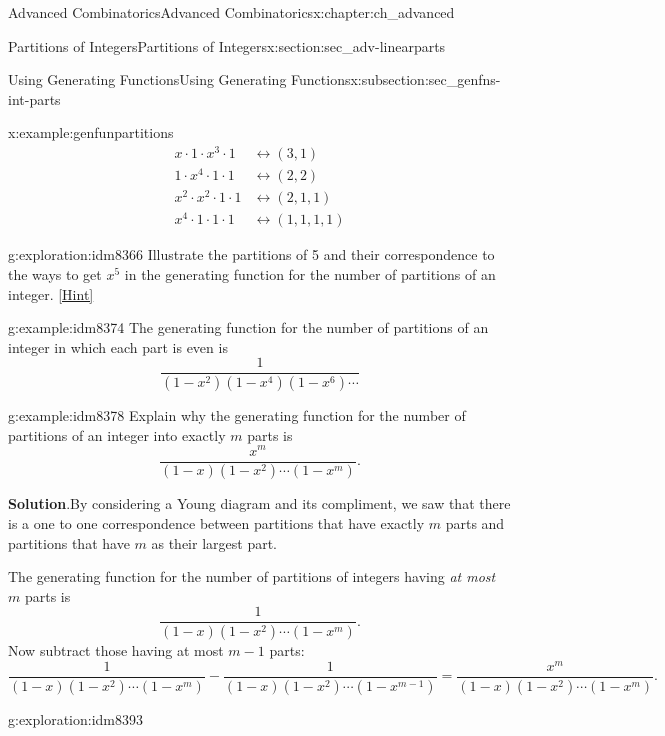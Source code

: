\documentclass[oneside,10pt,]{book}
\numberwithin{equation}{chapter}
\newcommand{\amp}{&}
\begin{document}
\begin{chapterptx}{Advanced Combinatorics}{}{Advanced Combinatorics}{}{}{x:chapter:ch_advanced}
\begin{sectionptx}{Partitions of Integers}{}{Partitions of Integers}{}{}{x:section:sec_adv-linearparts}
\begin{subsectionptx}{Using Generating Functions}{}{Using Generating Functions}{}{}{x:subsection:sec_genfns-int-parts}
\begin{example}{}{x:example:genfunpartitions}
\begin{align*}
x\cdot 1 \cdot x^3\cdot 1 \amp \leftrightarrow  (3,1) \\
1 \cdot x^4 \cdot 1\cdot 1 \amp \leftrightarrow  (2,2) \\
x^2\cdot x^2\cdot 1 \cdot 1 \amp \leftrightarrow  (2,1,1) \\
x^4 \cdot 1\cdot 1 \cdot 1 \amp \leftrightarrow  (1,1,1,1) 
\end{align*}
%
\end{example}
\begin{exploration}{}{g:exploration:idm8366}%
Illustrate the partitions of 5 and their correspondence to the ways to get \(x^5\) in the generating function for the number of partitions of an integer.%
\space\hspace*{0pt}\hfill{\tiny\hyperlink{g:hint:idm8370-back}{[Hint]}}\end{exploration}
\begin{example}{}{g:example:idm8374}%
The generating function for the number of partitions of an integer in which each part is even is%
\begin{equation*}
\frac{1}{(1-x^2)(1-x^4)(1-x^6)\cdots}
\end{equation*}
%
\end{example}
\begin{example}{}{g:example:idm8378}%
Explain why the generating function for the number of partitions of an integer into exactly \(m\) parts is%
\begin{equation*}
\frac{x^m}{(1-x)(1-x^2)\cdots(1-x^m)}\text{.}
\end{equation*}
%
\par\smallskip%
\noindent\textbf{Solution}.\hypertarget{g:solution:idm8383}{}\quad{}By considering a Young diagram and its compliment, we saw that there is a one to one correspondence between partitions that have exactly \(m\) parts and partitions that have \(m\) as their largest part.%
\par
The generating function for the number of partitions of integers having \emph{at most} \(m\) parts is%
\begin{equation*}
\frac{1}{(1-x)(1-x^2)\cdots (1-x^m)}\text{.}
\end{equation*}
Now subtract those having at most \(m-1\) parts:%
\begin{equation*}
\frac{1}{(1-x)(1-x^2)\cdots (1-x^m)} - \frac{1}{(1-x)(1-x^2)\cdots (1-x^{m-1})} = \frac{x^m}{(1-x)(1-x^2)\cdots(1-x^m)}\text{.}
\end{equation*}
%
\end{example}
\begin{exploration}{}{g:exploration:idm8393}%

\end{exploration}
\end{subsectionptx}
\end{sectionptx}
\end{chapterptx}
\end{document}

